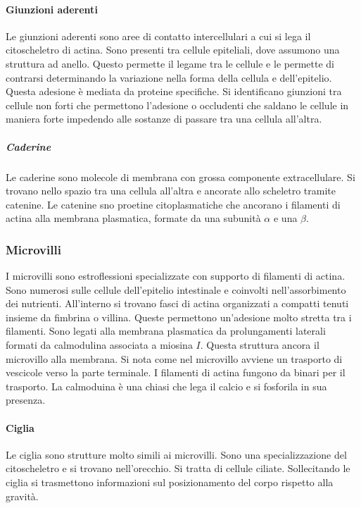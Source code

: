 			\paragraph{Giunzioni aderenti}
			Le giunzioni aderenti sono aree di contatto intercellulari a cui si lega il citoscheletro di actina.
			Sono presenti tra cellule epiteliali, dove assumono una struttura ad anello.
			Questo permette il legame tra le cellule e le permette di contrarsi determinando la variazione nella forma della cellula e dell'epitelio.
			Questa adesione \`e mediata da proteine specifiche.
			Si identificano giunzioni tra cellule non forti che permettono l'adesione o occludenti che saldano le cellule in maniera forte impedendo alle sostanze di passare tra una cellula all'altra.

				\subparagraph{Caderine}
				Le caderine sono molecole di membrana con grossa componente extracellulare.
				Si trovano nello spazio tra una cellula all'altra e ancorate allo scheletro tramite catenine.
				Le catenine sno proetine citoplasmatiche che ancorano i filamenti di actina alla membrana plasmatica, formate da una subunit\`a $\alpha$ e una $\beta$.

		\subsubsection{Microvilli}
		I microvilli sono estroflessioni specializzate con supporto di filamenti di actina.
		Sono numerosi sulle cellule dell'epitelio intestinale e coinvolti nell'assorbimento dei nutrienti.
		All'interno si trovano fasci di actina organizzati a compatti tenuti insieme da fimbrina o villina.
		Queste permettono un'adesione molto stretta tra i filamenti.
		Sono legati alla membrana plasmatica da prolungamenti laterali formati da calmodulina associata a miosina $I$.
		Questa struttura ancora il microvillo alla membrana.
		Si nota come nel microvillo avviene un trasporto di vescicole verso la parte terminale.
		I filamenti di actina fungono da binari per il trasporto.
		La calmoduina \`e una chiasi che lega il calcio e si fosforila in sua presenza.

			\paragraph{Ciglia}
			Le ciglia sono strutture molto simili ai microvilli.
			Sono una specializzazione del citoscheletro e si trovano nell'orecchio.
			Si tratta di cellule ciliate.
			Sollecitando le ciglia si trasmettono informazioni sul posizionamento del corpo rispetto alla gravit\`a.

